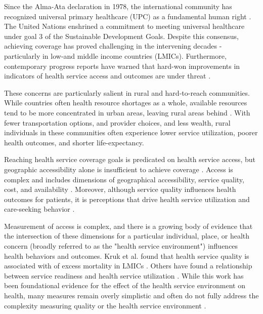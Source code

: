 Since the Alma-Ata declaration in 1978, the international community has recognized universal primary healthcare (UPC) as a fundamental human right \autocite{rifkin_alma_2018}. The United Nations enshrined a commitment to meeting universal healthcare under goal 3 of the Sustainable Development Goals. Despite this consensus, achieving coverage has proved challenging in the intervening decades - particularly in low-and middle income countries (LMICs). Furthermore, contemporary progress reports have warned that hard-won improvements in indicators of health service access and outcomes are under threat \autocite{world_health_organization_protect_2022}.

These concerns are particularly salient in rural and hard-to-reach communities. While countries often health resource shortages as a whole, available resources tend to be more concentrated in urban areas, leaving rural areas behind \autocite{strasser_rural_2003, johnston_training_2020, strasser_rural_2016}. With fewer transportation options, and provider choices, and less wealth, rural individuals in these communities often experience lower service utilization, poorer health outcomes, and shorter life-expectancy.

Reaching health service coverage goals is predicated on health service access, but geographic accessibility alone is insufficient to achieve coverage \autocite{shengelia_access_2005}. Access is complex and includes dimensions of geographical accessibility, service quality, cost,  and availability \autocite{penchansky_concept_1981}. Moreover, although service quality influences health outcomes for patients, it is perceptions that drive health service utilization and care-seeking behavior \autocite{saurman_improving_2015, evans_universal_2013, zastowny_patient_1989}.

Measurement of access is complex, and there is a growing body of evidence that the intersection of these dimensions for a particular individual, place, or health concern (broadly referred to as the "health service environment") influences health behaviors and outcomes. Kruk et al. found that health service quality is associated with of excess mortality in LMICs \autocite{kruk_mortality_2018}. Others have found a relationship between service readiness and health service utilization \autocite{sochas_predictive_2020, escamilla_role_2018, liu_exploring_2019, gage_does_2018}. While this work has been foundational evidence for the effect of the health service environment on health, many measures remain overly simplistic and often do not fully address the complexity measuring quality or the health service environment \autocite{hanefeld_understanding_2017}.

